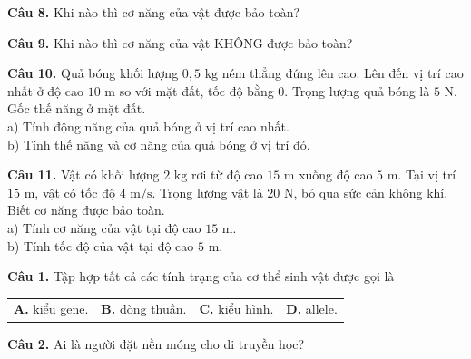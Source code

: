 \documentclass{article}
\begin{document}
\fontsize{26}{34}\selectfont
\textbf{Câu 8.} Khi nào thì cơ năng của vật được bảo toàn?

\vspace*{\fill}

\textbf{Câu 9.} Khi nào thì cơ năng của vật KHÔNG được bảo toàn?
\vspace*{\fill}
\newpage

\fontsize{25}{33}\selectfont
\textbf{Câu 10.} Quả bóng khối lượng $0,5\text{ kg}$ ném thẳng đứng lên cao. Lên đến vị trí cao nhất ở độ cao $10\text{ m}$ so với mặt đất, tốc độ bằng $0$. Trọng lượng quả bóng là $5\text{ N}$. Gốc thế năng ở mặt đất.\\
a) Tính động năng của quả bóng ở vị trí cao nhất.\\
b) Tính thế năng và cơ năng của quả bóng ở vị trí đó.
\vspace*{\fill}
\newpage

\fontsize{25}{33}\selectfont
\textbf{Câu 11.} Vật có khối lượng $2\text{ kg}$ rơi từ độ cao $15\text{ m}$ xuống độ cao $5\text{ m}$. Tại vị trí $15\text{ m}$, vật có tốc độ $4\text{ m/s}$. Trọng lượng vật là $20\text{ N}$, bỏ qua sức cản không khí. Biết cơ năng được bảo toàn.\\
a) Tính cơ năng của vật tại độ cao $15\text{ m}$.\\
b) Tính tốc độ của vật tại độ cao $5\text{ m}$.
\vspace*{\fill}
\newpage


\fontsize{26}{34}\selectfont
\textbf{Câu 1.} Tập hợp tất cả các tính trạng của cơ thể sinh vật được gọi là
\vspace{6pt}

\begin{tabularx}{\linewidth}{@{}X X X X@{}}
\textbf{A.} kiểu gene. & \textbf{B.} dòng thuần. & \textbf{C.} kiểu hình. & \textbf{D.} allele.
\end{tabularx}

\vspace*{\fill}

\textbf{Câu 2.} Ai là người đặt nền móng cho di truyền học?
\vspace{6pt}
\end{document}
